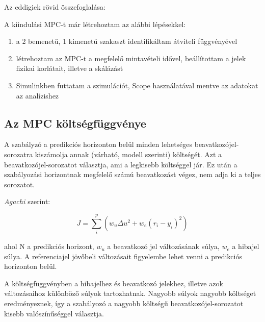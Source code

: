 Az eddigiek rövid összefoglalása:

A kiindulási MPC-t már létrehoztam az alábbi lépésekkel:%


\begin{enumerate}[noitemsep,topsep=0pt,parsep=2pt,partopsep=4pt,leftmargin=30pt]
	\item a 2 bemenetű, 1 kimenetű szakaszt identifikáltam átviteli függvényével
	\item létrehoztam az MPC-t a megfelelő mintavételi idővel, beállítottam a jelek fizikai korlátait, illetve a skálázást
	\item Simulinkben futtatam a szimulációt, Scope használatával mentve az adatokat az analízishez
	
\end{enumerate}

\subsection{Az MPC költségfüggvénye}


A szabályzó a predikciós horizonton belül minden lehetséges beavatkozójel-sorozatra kiszámolja annak (várható, modell szerinti) költségét. Azt a beavatkozójel-sorozatot választja, ami a legkisebb költséggel jár. Ez után a szabályozási horizontnak megfelelő számú beavatkozást végez, nem adja ki a teljes sorozatot. 

\textit{Agachi \cite{romanMPC_Agachi}} szerint:

\begin{equation} \label{eq_mpc_cost}
J = \sum_{i}^{p} \left(w_u \Delta u^2 + w_e (r_i-y_i)^2  \right)
\end{equation}

ahol N a predikciós horizont, $w_u$ a beavatkozó jel változásának súlya, $w_e$ a hibajel súlya. A referenciajel jövőbeli változásait figyelembe lehet venni a predikciós horizonton belül.

A költségfüggvényben a hibajelhez és beavatkozó jelekhez, illetve azok változásaihoz különböző súlyok tartozhatnak.
Nagyobb súlyok nagyobb költséget eredményeznek, így a szabályozó a nagyobb költségű beavatkozójel-sorozatot kisebb valószínűséggel választja.


